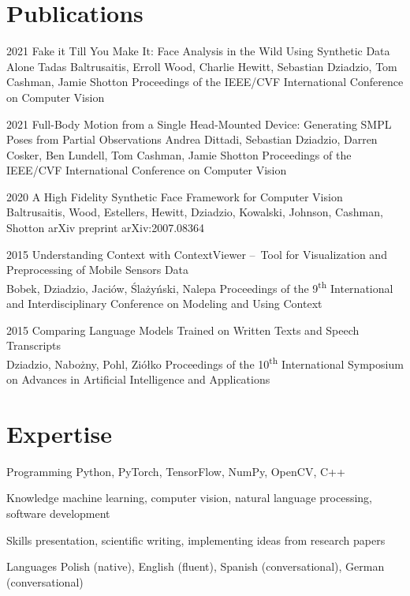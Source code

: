\documentclass[]{friggeri-cv_osx}
\begin{document}
\section{Publications}
\begin{entrylist}
\entry
{2021}
{Fake it Till You Make It: Face Analysis in the Wild Using Synthetic Data Alone}
{Tadas Baltrusaitis, Erroll Wood, Charlie Hewitt, Sebastian Dziadzio, Tom Cashman, Jamie Shotton}
{Proceedings of the IEEE/CVF International Conference on Computer Vision\\}

\entry
{2021}
{Full-Body Motion from a Single Head-Mounted Device: Generating SMPL Poses from Partial Observations}
{Andrea Dittadi, Sebastian Dziadzio, Darren Cosker, Ben Lundell, Tom Cashman, Jamie Shotton}
{Proceedings of the IEEE/CVF International Conference on Computer Vision\\}

\entry
{2020}
{A High Fidelity Synthetic Face Framework for Computer Vision\\}
{Baltrusaitis, Wood, Estellers, Hewitt, Dziadzio, Kowalski, Johnson, Cashman, Shotton}
{arXiv preprint arXiv:2007.08364\\}

\entry
{2015}
{Understanding Context with ContextViewer – Tool for Visualization and Preprocessing of Mobile Sensors Data\\}
{Bobek, Dziadzio, Jaciów, Ślażyński, Nalepa}
{Proceedings of the 9\textsuperscript{th} International and Interdisciplinary Conference on Modeling and Using Context\\}

\entry
{2015}
{Comparing Language Models Trained on Written Texts and Speech Transcripts\\}
{Dziadzio, Nabożny, Pohl, Ziółko}
{Proceedings of the 10\textsuperscript{th} International Symposium on Advances in Artificial Intelligence and Applications\\}
\end{entrylist}

\section{Expertise}
\begin{entrylist}
\entry
{}
{Programming}
{}
{Python, PyTorch, TensorFlow, NumPy, OpenCV, C++}

\entry
{}
{Knowledge}
{}
{machine learning, computer vision, natural language processing, software development}

\entry
{}
{Skills}
{}
{presentation, scientific writing, implementing ideas from research papers}

\entry
{}
{Languages}
{}
{Polish (native), English (fluent), Spanish (conversational), German (conversational)}
\end{entrylist}
\end{document}
